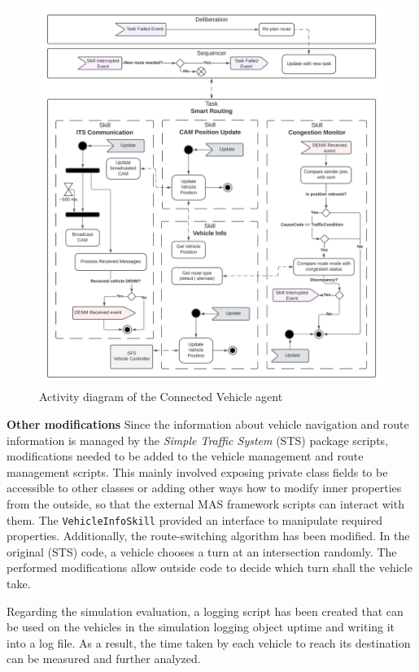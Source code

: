 \documentclass[0main.tex]{subfiles}
\begin{document}
\begin{figure}[htbp]
    \centering
    \includegraphics[width=.99\textwidth]{SmartRoutingVehicle.png}
    \caption{Activity diagram of the Connected Vehicle agent}
    \label{ad-smartRoutingVehicle}
\end{figure}

\textbf{Other modifications} \smallskip \newline
Since the information about vehicle navigation and route information is managed by the
\emph{Simple Traffic System} (STS) package scripts, modifications needed to be added to the
vehicle management and route management scripts. This mainly involved exposing private class fields
to be accessible to other classes or adding other ways how to modify inner properties from the outside,
so that the external MAS framework scripts can interact with them. The
\texttt{VehicleInfoSkill} provided an interface to manipulate required properties.
Additionally, the route-switching algorithm has been modified. In the original (STS) code,
a vehicle chooses a turn at an intersection randomly. The performed modifications allow outside 
code to decide which turn shall the vehicle take.

Regarding the simulation evaluation, a logging script has been created that can be used on the 
vehicles in the simulation logging object uptime and writing it into a log file. As a result, 
the time taken by each vehicle to reach its destination can be measured and further analyzed.
\end{document}
